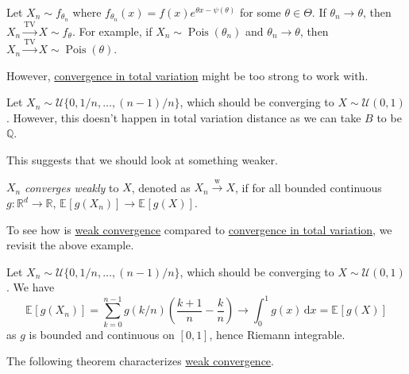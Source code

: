\begin{eg}
	Let \(X_n \sim f_{\theta _n}\) where \(f_{\theta _n}(x) = f(x) e^{\theta x - \psi (\theta )}\) for some \(\theta \in \Theta \). If \(\theta _n \to \theta \), then \(X_n \overset{\operatorname{TV} }{\to } X \sim f_\theta \). For example, if \(X_n \sim \operatorname{Pois}(\theta _n) \) and \(\theta _n \to \theta \), then \(X_n \overset{\operatorname{TV} }{\to } X \sim \operatorname{Pois}(\theta ) \).
\end{eg}

However, \hyperref[def:convergence-in-total-variation]{convergence in total variation} might be too strong to work with.

\begin{eg}
	Let \(X_n \sim \mathcal{U} \{ 0, 1 / n, \dots , (n-1) / n \} \), which should be converging to \(X \sim \mathcal{U} (0, 1)\). However, this doesn't happen in total variation distance as we can take \(B\) to be \(\mathbb{Q} \).
\end{eg}

This suggests that we should look at something weaker.

\begin{definition}\label{def:weak-convergence}
	\(X_n \) \emph{converges weakly} to \(X\), denoted as \(X_n \overset{\text{w} }{\to } X\), if for all bounded continuous \(g \colon \mathbb{R} ^d \to \mathbb{R} \), \(\mathbb{E}_{}\left[g(X_n) \right] \to \mathbb{E}_{}\left[g(X) \right]\).
\end{definition}

To see how is \hyperref[def:weak-convergence]{weak convergence} compared to \hyperref[def:convergence-in-total-variation]{convergence in total variation}, we revisit the above example.

\begin{eg}
	Let \(X_n \sim \mathcal{U} \{ 0, 1 / n, \dots , (n-1) / n \} \), which should be converging to \(X \sim \mathcal{U} (0, 1)\). We have
	\[
		\mathbb{E}_{}\left[g(X_n) \right]
		= \sum_{k=0}^{n-1} g(k / n) \left( \frac{k+1}{n} - \frac{k}{n} \right)
		\to \int_{0}^{1} g(x) \,\mathrm{d}x
		= \mathbb{E}_{}\left[g(X) \right]
	\]
	as \(g\) is bounded and continuous on \([0, 1]\), hence Riemann integrable.
\end{eg}

The following theorem characterizes \hyperref[def:weak-convergence]{weak convergence}.

